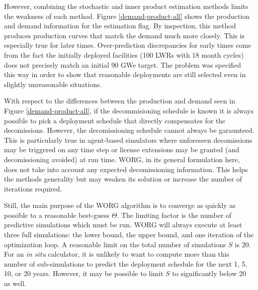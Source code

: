 However, combining the stochastic and inner product estimation methods limits
the weakness of each method. Figure \ref{demand-product-all} shows the
production and demand information for the \allflag estimation flag.
By inspection,
this method produces production curves that match the demand much more
closely. This is especially true for later times. Over-prediction
discrepancies for early times come from the fact the initially deployed
facilities (100 LWRs with 18 month cycles) does not precisely match an
initial 90 GWe target. The problem was specified this way in order to show
that reasonable deployments are still selected even in slightly
unreasonable situations.

With respect to the differences between the production and demand seen in
Figure \ref{demand-product-all}, if the decommisioning schedule is known
it is always possible to pick a deployment schedule that directly
compensates for the decomissions. However, the decomissioning schedule
cannot always be garaunteed. This is particularly true in agent-based
simulators where unforeseen decomissions may be triggered on any time step
or license extensions may be granted (and decomissioning avoided) at
run time.
WORG, in its general formulation here, does not take into account any
expected decomissioning information. This helps the methods generality
but may weaken its solution or increase the number of iterations
required.

Still, the main purpose of the WORG algorithm is to converge as quickly as
possible to a reasonable best-guess $\Theta$. The limiting factor is the
number of
predictive simulations which must be run. WORG will always execute
at least three full simulations: the lower bound, the upper bound, and one
iteration of the optimization loop. A reasonable limit on the total number
of simulations $S$ is 20.  For an \emph{in situ} calculator, it is unlikely
to want to compute more than this number of sub-simulations to predict
the deployment schedule for the next 1, 5, 10, or 20 years. However, it
may be possible to limit $S$ to significantly below 20 as well.

